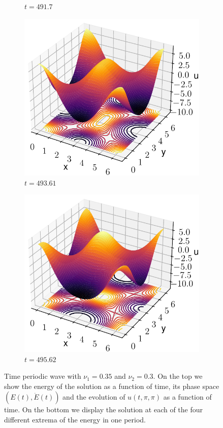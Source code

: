 \documentclass[twoside]{article}
\begin{document}
\begin{figure}
\begin{subfigure}[ht]{0.24\textwidth}
    \caption{$t=491.7$}
  \end{subfigure}\hfill
  \begin{subfigure}[ht]{0.24\textwidth}
    \includegraphics[width=\textwidth]{images/slice_nu1_0.35_nu2_0.3_time_493.61.pdf}
    \caption{$t=493.61$}
  \end{subfigure}\hfill
  \begin{subfigure}[ht]{0.24\textwidth}
    \includegraphics[width=\textwidth]{images/slice_nu1_0.35_nu2_0.3_time_495.62.pdf}
    \caption{$t=495.62$}
  \end{subfigure}
  \caption{Time periodic wave with $\nu_1=0.35$ and $\nu_2=0.3$. On the top we show the energy of the solution as a function of time, its phase space $(E(t), \dot{E}(t))$ and the evolution of $u(t,\pi,\pi)$ as a function of time. On the bottom we display the solution at each of the four different extrema of the energy in one period.}
  \label{fig:sections_tp}
\end{figure}
\end{document}

